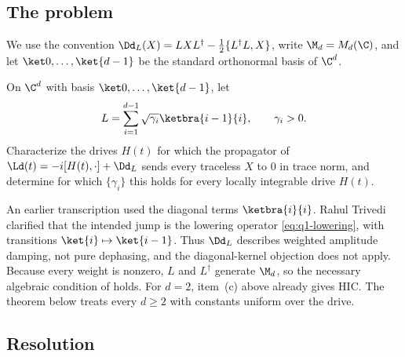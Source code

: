 \documentclass[class=article,11pt,a4paper,crop=false]{standalone}
\begin{document}
\subsection{The problem}

We use the convention
$\Dd_L(X)=LXL^\dagger-\tfrac12\{L^\dagger L,X\}$, write
$\M_d=M_d(\C)$, and let $\ket0,\dots,\ket{d-1}$ be the standard orthonormal
basis of $\C^d$.

\begin{problem}\label{prob:lowering}
	On $\C^d$ with basis $\ket0,\dots,\ket{d-1}$, let
	\begin{equation}
		L=\sum_{i=1}^{d-1}\sqrt{\gamma_i} \ketbra{i-1}{i},
		\qquad \gamma_i>0.
		\label{eq:q1-lowering}
	\end{equation}
	Characterize the drives $H(t)$ for which the propagator of
	$\Ld(t)=-i[H(t),\cdot]+\Dd_L$ sends every traceless $X$ to $0$ in trace
	norm, and determine for which $\{\gamma_i\}$ this holds for every locally
	integrable drive $H(t)$.
\end{problem}

\begin{remark}\label{rem:q1-correction}
	An earlier transcription used the diagonal terms $\ketbra{i}{i}$. Rahul
	Trivedi clarified that the intended jump is the lowering operator
	\eqref{eq:q1-lowering}, with transitions
	$\ket{i}\mapsto\ket{i-1}$. Thus $\Dd_L$ describes weighted amplitude damping,
	not pure dephasing, and the diagonal-kernel objection does not apply.
	Because every weight is nonzero, $L$ and $L^\dagger$ generate $\M_d$, so the
	necessary algebraic condition of \cite{Wolff2026Contractivity} holds. For
	$d=2$, item~(c) above already gives HIC. The theorem below treats every
	$d\ge2$ with constants uniform over the drive.
\end{remark}

\subsection{Resolution}\label{sec:q1-resolution}
\end{document}
